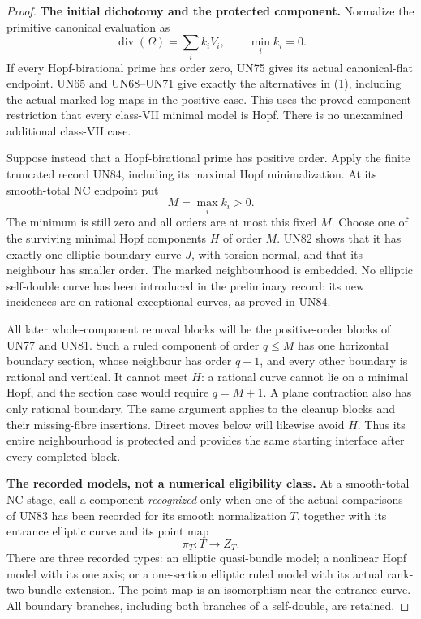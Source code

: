 \begin{proof}
\par\medskip\noindent\textbf{The initial dichotomy and the protected component.}
Normalize the primitive canonical evaluation as
\[
       \operatorname{div}(\Omega)=\sum_i k_iV_i,
       \qquad \min_i k_i=0.
 \tag{C.GP.2}
\]
If every Hopf-birational prime has order zero, UN75
gives its actual canonical-flat endpoint. UN65 and
UN68--UN71 give exactly the alternatives in (1),
including the actual marked log maps in the positive
case. This uses the proved component restriction that
every class-VII minimal model is Hopf. There is no
unexamined additional class-VII case.

Suppose instead that a Hopf-birational prime has
positive order. Apply the finite truncated record
UN84, including its maximal Hopf minimalization. At
its smooth-total NC endpoint put
\[
                  M=\max_i k_i>0.
 \tag{C.GP.3}
\]
The minimum is still zero and all orders are at
most this fixed \(M\). Choose one of the surviving
minimal Hopf components \(H\) of order \(M\).
UN82 shows that it has exactly one elliptic
boundary curve \(J\), with torsion normal, and
that its neighbour has smaller order. The marked
neighbourhood is embedded. No elliptic self-double
curve has been introduced in the preliminary
record: its new incidences are on rational
exceptional curves, as proved in UN84.

All later whole-component removal blocks will be
the positive-order blocks of UN77 and UN81. Such
a ruled component of order \(q\le M\) has one
horizontal boundary section, whose neighbour has
order \(q-1\), and every other boundary is rational
and vertical. It cannot meet \(H\): a rational
curve cannot lie on a minimal Hopf, and the
section case would require \(q=M+1\). A plane
contraction also has only rational boundary.
The same argument applies to the cleanup blocks
and their missing-fibre insertions. Direct moves
below will likewise avoid \(H\). Thus its entire
neighbourhood is protected and provides the same
starting interface after every completed block.

\par\medskip\noindent\textbf{The recorded models, not a numerical eligibility class.}
At a smooth-total NC stage, call a component
\emph{recognized} only when one of the actual
comparisons of UN83 has been recorded for its
smooth normalization \(T\), together with its
entrance elliptic curve and its point map
\[
                         \pi_T:T\longrightarrow Z_T.
 \tag{C.GP.4}
\]
There are three recorded types: an elliptic
quasi-bundle model; a nonlinear Hopf model with
its one axis; or a one-section elliptic ruled
model with its actual rank-two bundle extension.
The point map is an isomorphism near the entrance
curve. All boundary branches, including both
branches of a self-double, are retained.


\end{proof}
